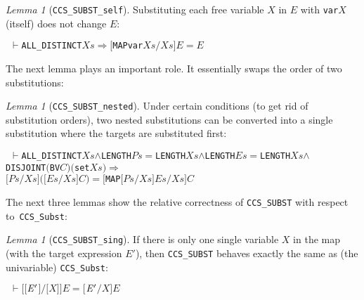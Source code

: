 \documentclass[GCNS]{yincog}
\renewcommand{\HOLinline}[1]{\mbox{\textup{\texttt{#1}}}}
\renewcommand{\HOLConst}[1]{\texttt{#1}}
\renewcommand{\HOLFreeVar}[1]{\ensuremath{\mathit{#1}}}
\renewcommand{\HOLSymConst}[1]{#1}
\renewcommand{\HOLTokenConj}{\ensuremath{\wedge}}
\renewcommand{\HOLTokenTurnstile}{\ensuremath{\:\:\vdash}}
\theoremstyle{remark}
\theoremstyle{theorem}
\newtheorem{lemma}[definition]{Lemma}
\theoremstyle{remark}
\renewcommand{\HOLTokenImp}{\ensuremath{\Longrightarrow}}
\newcommand{\univariate}{univariable\xspace}
\begin{document}
\begin{lemma}[\texttt{CCS\_SUBST\_self}]
Substituting each free variable $X$ in $E$ with
\HOLinline{\HOLConst{var}\\\;\HOLFreeVar{X}} (itself) does not change
$E$:
%
\begin{alltt}
\HOLTokenTurnstile{} \HOLConst{ALL\_DISTINCT} \HOLFreeVar{Xs} \HOLSymConst{\HOLTokenImp{}} \ensuremath{[}\HOLConst{MAP} \HOLConst{var} \HOLFreeVar{Xs}\ensuremath{/}\HOLFreeVar{Xs}\ensuremath{]} \HOLFreeVar{E} \HOLSymConst{\ensuremath{=}} \HOLFreeVar{E}
\end{alltt}
%
\end{lemma}

The next lemma plays an important role. It essentially swaps the order
of two substitutions:
%
\begin{lemma}[\texttt{CCS\_SUBST\_nested}]
Under certain conditions (to get rid of substitution orders), two nested
substitutions can be converted into a single substitution where the targets
are substituted first:
%
\begin{alltt}
\HOLTokenTurnstile{} \HOLConst{ALL\_DISTINCT} \HOLFreeVar{Xs} \HOLSymConst{\HOLTokenConj{}} \HOLConst{LENGTH} \HOLFreeVar{Ps} \HOLSymConst{\ensuremath{=}} \HOLConst{LENGTH} \HOLFreeVar{Xs} \HOLSymConst{\HOLTokenConj{}} \HOLConst{LENGTH} \HOLFreeVar{Es} \HOLSymConst{\ensuremath{=}} \HOLConst{LENGTH} \HOLFreeVar{Xs} \HOLSymConst{\HOLTokenConj{}}
   \HOLConst{DISJOINT} \ensuremath{(}\HOLConst{BV} \HOLFreeVar{C}\ensuremath{)} \ensuremath{(}\HOLConst{set} \HOLFreeVar{Xs}\ensuremath{)} \HOLSymConst{\HOLTokenImp{}}
   \ensuremath{[}\HOLFreeVar{Ps}\ensuremath{/}\HOLFreeVar{Xs}\ensuremath{]} \ensuremath{(}\ensuremath{[}\HOLFreeVar{Es}\ensuremath{/}\HOLFreeVar{Xs}\ensuremath{]} \HOLFreeVar{C}\ensuremath{)} \HOLSymConst{\ensuremath{=}} \ensuremath{[}\HOLConst{MAP} \ensuremath{[}\HOLFreeVar{Ps}\ensuremath{/}\HOLFreeVar{Xs}\ensuremath{]} \HOLFreeVar{Es}\ensuremath{/}\HOLFreeVar{Xs}\ensuremath{]} \HOLFreeVar{C}
\end{alltt}
%
\end{lemma}

The next three lemmas show the relative correctness of
\texttt{CCS\_SUBST} with respect to~\texttt{CCS\_Subst}:
%
\begin{lemma}[\texttt{CCS\_SUBST\_sing}]
If there is only one single variable $X$ in the map (with the target expression
$E'$), then \HOLinline{\HOLConst{CCS\_SUBST}} behaves exactly the same as
(the \univariate ) \HOLinline{\HOLConst{CCS\_Subst}}:
%
\begin{alltt}
\HOLTokenTurnstile{} \ensuremath{[}\ensuremath{[}\ensuremath{\HOLFreeVar{E}\sp{\prime}}\ensuremath{]}\ensuremath{/}\ensuremath{[}\HOLFreeVar{X}\ensuremath{]}\ensuremath{]} \HOLFreeVar{E} \HOLSymConst{\ensuremath{=}} \ensuremath{[}\ensuremath{\HOLFreeVar{E}\sp{\prime}}\ensuremath{/}\HOLFreeVar{X}\ensuremath{]} \HOLFreeVar{E}
\end{alltt}
%
\end{lemma}
\end{document}
